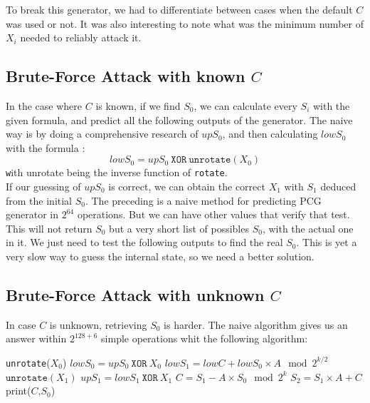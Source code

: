 \documentclass[preprint]{iacrtrans}
\begin{document}
To break this generator, we had to differentiate between cases when the default $C$ was used or not. It was also interesting to note what was the minimum number of $X_i$ needed to reliably attack it.

\subsection{Brute-Force Attack with known $C$}
In the case where $C$ is known, if we find $S_0$, we can calculate every $S_i$ with the given formula, and predict all the following outputs of the generator. The naive way is by doing a comprehensive research of $upS_0$, and then calculating $lowS_0$ with the formula :\\
\begin{equation}
    lowS_0 = upS_0\ \mathtt{XOR}\ \mathtt{unrotate}(X_0)
\end{equation}
\texttt with {unrotate} being the inverse function of \texttt{rotate}.\\


If our guessing of $upS_0$ is correct, we can obtain the correct $X_1$ with $S_1$ deduced from the initial $S_0$. The preceding is a naive method for predicting PCG generator in $2^{64}$ operations. But we can have other values that verify that test. This will not return $S_0$ but a very short list of possibles $S_0$, with the actual one in it. We just need to test the following outputs to find the real $S_0$. This is yet a very slow way to guess the internal state, so we need a better solution.

\subsection{Brute-Force Attack with unknown $C$}

In case $C$ is unknown, retrieving $S_0$ is harder. The naive algorithm gives us an answer within $2^{128+6}$ simple operations whit the following algorithm:
\\
\begin{algorithmic}[!h]
    \STATE \texttt{unrotate}($X_0$)
    \STATE $lowS_0 = upS_0\ \mathtt{XOR}\ X_0$
    \STATE $lowS_1 = lowC + lowS_0 \times A \mod{2^{k/2}}$
        \STATE $\mathtt{unrotate}(X_1)$
        \STATE $upS_1 = lowS_1\ \mathtt{XOR}\ X_1$
        \STATE $C = S_1 - A \times S_0 \mod{2^{k}}$
        \STATE $S_2 = S_1 \times A + C$
            \STATE print($C$,$S_0$)
        \ENDIF
    \ENDFOR
\ENDFOR
\end{algorithmic}
\end{document}
